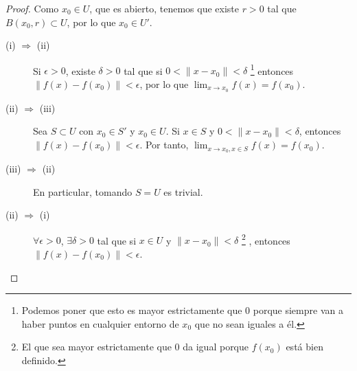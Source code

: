 \begin{proof}
Como $\displaystyle x_{0} \in U $, que es abierto, tenemos que existe $\displaystyle r > 0 $ tal que $\displaystyle B\left(x_{0},r \right) \subset U $, por lo que $\displaystyle x_{0} \in U' $.
\begin{description}
\item[(i) $\displaystyle \Rightarrow $ (ii)] Si $\displaystyle \epsilon > 0 $, existe $\displaystyle \delta > 0 $ tal que si $\displaystyle 0<\|x - x_{0}\| < \delta  $ \footnote{Podemos poner que esto es mayor estrictamente que 0 porque siempre van a haber puntos en cualquier entorno de $\displaystyle x_{0} $ que no sean iguales a él.} entonces $\displaystyle \|f\left(x\right)-f\left(x_{0}\right)\| < \epsilon  $, por lo que $\displaystyle \lim_{x \to x_{0}}f\left(x\right) = f\left(x_{0}\right) $.
\item[(ii) $\displaystyle  \Rightarrow $ (iii)] Sea $\displaystyle S \subset U $ con $\displaystyle x_{0} \in S' $ y $\displaystyle x_{0} \in U $. Si $\displaystyle x \in S $ y $\displaystyle  0 < \|x -x_{0}\| < \delta  $, entonces $\displaystyle \|f\left(x\right)-f\left(x_{0}\right)\| < \epsilon  $. Por tanto, $\displaystyle \lim_{x \to x_{0}, x \in S}f\left(x\right) = f\left(x_{0}\right) $.
\item[(iii) $\displaystyle \Rightarrow $ (ii)] En particular, tomando $\displaystyle S = U $ es trivial. 
\item[(ii) $\displaystyle \Rightarrow $ (i)] $\displaystyle \forall \epsilon > 0 $, $\displaystyle \exists \delta > 0 $ tal que si $\displaystyle x \in U $ y $\displaystyle  \|x - x_{0}\| < \delta  $ \footnote{El que sea mayor estrictamente que 0 da igual porque $\displaystyle f\left(x_{0}\right) $ está bien definido.} , entonces $\displaystyle \|f\left(x\right)-f\left(x_{0}\right)\|<\epsilon  $. 
\end{description}
\end{proof}

